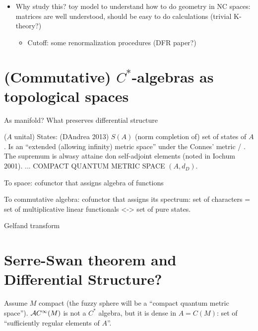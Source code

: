 \begin{itemize}
\begin{itemize}
        \end{itemize}
   
   \item Why study this? toy model to understand how to do geometry in NC spaces: matrices are well understood, should be easy to do calculations (trivial K-theory?)
   
        \begin{itemize}
            
        \item Cutoff: some renormalization procedures (DFR paper?)
            
        \end{itemize}
    
    \end{itemize}

\linea

\section{(Commutative) $C^*$-algebras as topological spaces}

As manifold? What preserves differential structure

($A$ unital) States: (DAndrea 2013) $S(A)$ (norm completion of) set of states of $A$. Is an ``extended (allowing infinity) metric space'' under the Connes' metric / . The supremum is alwasy attaine don self-adjoint elements (noted in Iochum 2001). ... COMPACT QUANTUM METRIC SPACE $(A,  d_{D})$.

To space: cofunctor that assigns algebra of functions

To commutative algebra: cofunctor that assigns its spectrum: set of characters = set of multiplicative linear functionals <-> set of pure states.

Gelfand transform

\section{Serre-Swan theorem and Differential Structure?}

Assume $M$ compact (the fuzzy sphere will be a ``compact quantum metric space''). $\mathcal A C^\infty(M)$ is not a $C^*$ algebra, but it is dense in $A = C(M)$: set of ``sufficiently regular elements of $A$''.


